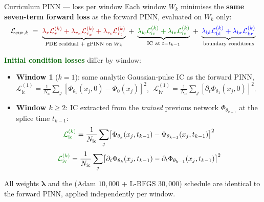 \documentclass[aspectratio=169, 11pt]{beamer}
\begin{document}
\begin{frame}{Curriculum PINN --- loss per window}
  \footnotesize
  Each window $W_{k}$ minimises the \textbf{same seven-term forward loss}
  as the forward PINN, evaluated on $W_{k}$ only:
  \[
    \mathcal{L}_{\mathrm{cur},k}
    \;=\;
    \underbrace{\textcolor{darkred}{\lambda_{r}\mathcal{L}_{r}^{(k)}
      + \lambda_{r_{x}}\mathcal{L}_{r_{x}}^{(k)}
      + \lambda_{r_{t}}\mathcal{L}_{r_{t}}^{(k)}}}_{\text{PDE residual + gPINN on }W_{k}}
    \;+\;
    \underbrace{\textcolor{darkgreen}{\lambda_{\mathrm{ic}}\mathcal{L}_{\mathrm{ic}}^{(k)}
      + \lambda_{\mathrm{iv}}\mathcal{L}_{\mathrm{iv}}^{(k)}}}_{\text{IC at }t=t_{k-1}}
    \;+\;
    \underbrace{\textcolor{blue}{\lambda_{\mathrm{bl}}\mathcal{L}_{\mathrm{bl}}^{(k)}
      + \lambda_{\mathrm{br}}\mathcal{L}_{\mathrm{br}}^{(k)}}}_{\text{boundary conditions}}
  \]
  \medskip

  \textcolor{darkgreen}{\textbf{Initial condition losses}} differ by window:
  \begin{itemize}
    \item \textbf{Window 1} ($k\!=\!1$): same analytic Gaussian-pulse IC as
          the forward PINN,
          $\mathcal{L}_{\mathrm{ic}}^{(1)} \!=\! \frac{1}{N_{\mathrm{ic}}}
          \sum_j[\Phi_{\theta_{1}}(x_j,0) - \Phi_{0}(x_j)]^{2}$,
          $\;\mathcal{L}_{\mathrm{iv}}^{(1)} \!=\! \frac{1}{N_{\mathrm{ic}}}
          \sum_j[\partial_t\Phi_{\theta_{1}}(x_j,0)]^{2}$.

    \item \textbf{Window $k\!\ge\!2$}: IC extracted from the \emph{trained}
          previous network $\Phi_{\theta_{k-1}}$ at the splice time $t_{k-1}$:
          \[
            \textcolor{darkgreen}{\mathcal{L}_{\mathrm{ic}}^{(k)}}
            = \frac{1}{N_{\mathrm{ic}}}\sum_{j}
              \bigl[\Phi_{\theta_{k}}(x_{j},t_{k-1})
                    - \Phi_{\theta_{k-1}}(x_{j},t_{k-1})\bigr]^{2}
          \]
          \[
            \textcolor{darkgreen}{\mathcal{L}_{\mathrm{iv}}^{(k)}}
            = \frac{1}{N_{\mathrm{ic}}}\sum_{j}
              \bigl[\partial_{t}\Phi_{\theta_{k}}(x_{j},t_{k-1})
                    - \partial_{t}\Phi_{\theta_{k-1}}(x_{j},t_{k-1})\bigr]^{2}
          \]
  \end{itemize}
  All weights $\boldsymbol{\lambda}$ and the (Adam $10{,}000$ + L-BFGS $30{,}000$)
  schedule are identical to the forward PINN, applied independently per window.
\end{frame}
\end{document}
